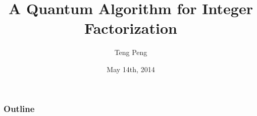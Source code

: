 \documentclass[t]{beamer}
\title{A Quantum Algorithm for Integer Factorization}
\author{Teng Peng}
\institute[BNU-HKBU United International College]
{
Supervised by Prof.Ken Tsang
}
\date{May 14th, 2014}
\begin{document}
\begin{frame}
\titlepage
\end{frame}

\begin{frame}
\frametitle{Outline}
\tableofcontents
\end{frame}


\end{document}
